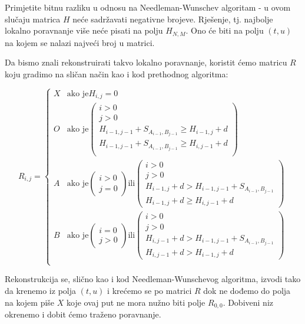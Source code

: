\documentclass[times, utf8, zavrsni]{fer}
\begin{document}
Primjetite bitnu razliku u odnosu na Needleman-Wunschev algoritam - u ovom
slučaju matrica $H$ neće sadržavati negativne brojeve. Rješenje, tj. najbolje
lokalno poravnanje više neće pisati na polju $H_{N, M}$. Ono će biti na polju 
$(t, u)$ na kojem se nalazi najveći broj u matrici.

Da bismo znali rekonstruirati takvo lokalno poravnanje, koristit ćemo matricu
$R$ koju gradimo na sličan način kao i kod prethodnog algoritma:

$$
R_{i,j} =  \left\{
	\begin{array}{ll}
		X & \mbox{ako je} H_{i,j}=0 \\
		O & \mbox{ako je} \left( \begin{array}{l} i>0 \\ j>0 \\
				H_{i-1,j-1} + S_{A_{i-1}, B_{j-1}} \geq H_{i-1,j} + d \\
				H_{i-1,j-1} + S_{A_{i-1}, B_{j-1}} \geq H_{i,j-1} + d \\
			\end{array} \right) \\
		A & \mbox{ako je} \left( \begin{array}{l} i>0 \\ j=0 \end{array} \right)
			\mbox{ili} \left( \begin{array}{l} i>0 \\ j>0 \\
				H_{i-1,j} + d > H_{i-1,j-1} + S_{A_{i-1}, B_{j-1}} \\
				H_{i-1,j} + d \geq H_{i,j-1} + d
			\end{array} \right) \\
		B & \mbox{ako je} \left( \begin{array}{l} i=0 \\ j>0 \end{array} \right)
			\mbox{ili} \left( \begin{array}{l} i>0 \\ j>0 \\
				H_{i,j-1} + d > H_{i-1,j-1} + S_{A_{i-1}, B_{j-1}} \\
				H_{i,j-1} + d > H_{i-1,j} + d
			\end{array} \right) \\
	\end{array}
\right.
$$

Rekonstrukcija se, slično kao i kod Needleman-Wunschevog algoritma,
izvodi tako da krenemo iz polja $(t, u)$ i krećemo se  po matrici $R$ dok
ne dođemo do polja na kojem piše $X$ koje ovaj put ne mora nužno biti 
polje $R_{0,0}$. Dobiveni niz okrenemo i dobit ćemo traženo poravnanje.
\end{document}
